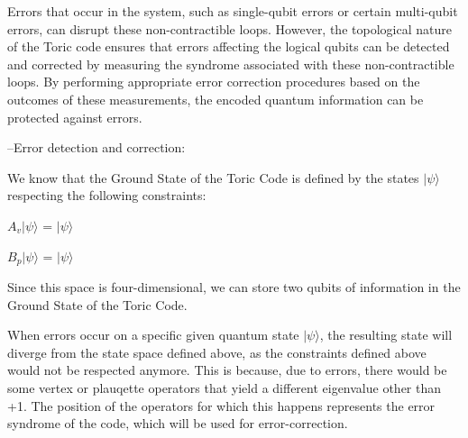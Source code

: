 \documentclass[12pt]{report}
\begin{document}
\begin{minipage}{1 \textwidth}
		
	\end{minipage}
	
	\begin{minipage}{1 \textwidth}
		
		Errors that occur in the system, such as single-qubit errors or certain multi-qubit errors, can disrupt these non-contractible loops. However, the topological nature of the Toric code ensures that errors affecting the logical qubits can be detected and corrected by measuring the syndrome associated with these non-contractible loops. By performing appropriate error correction procedures based on the outcomes of these measurements, the encoded quantum information can be protected against errors. \newline
		
		--Error detection and correction:\newline
		
		We know that the Ground State of the Toric Code is defined by the states $|\psi\rangle $ respecting the following constraints: \newline
		
		\begin{center}
			$A_v|\psi\rangle $ = $|\psi\rangle $ 
		\end{center}
		\begin{center}
			$B_p|\psi\rangle $ = $|\psi\rangle $ 
		\end{center}
		
		Since this space is four-dimensional, we can store two qubits of information in the Ground State of the Toric Code. \newline
		
		When errors occur on a specific given quantum state $|\psi\rangle$, the resulting state will diverge from the state space defined above, as the constraints defined above would not be respected anymore. This is because, due to errors, there would be some vertex or plauqette operators that yield a different eigenvalue other than +1.
		The position of the operators for which this happens represents the error syndrome of the code, which will be used for error-correction. \newline
		

\end{minipage}
\end{document}
